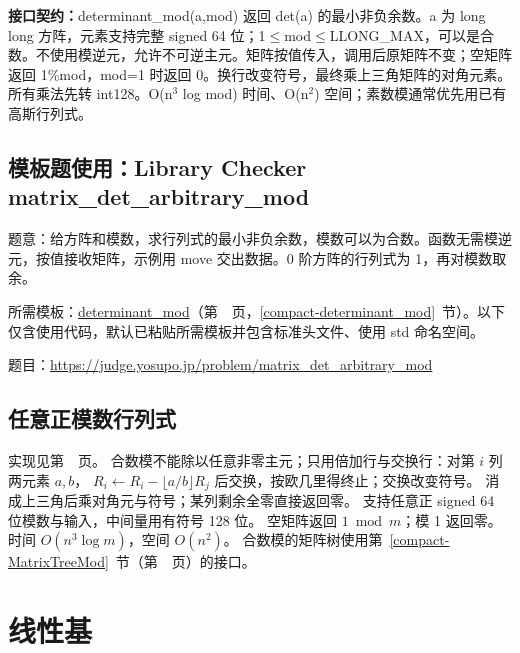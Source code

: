 {\sloppy{}\noindent\textbf{接口契约：}determinant\_mod(a,mod) 返回 det(a) 的最小非负余数。a 为 long long 方阵，元素支持完整 signed 64 位；1$\le$mod$\le$LLONG\_MAX，可以是合数。不使用模逆元，允许不可逆主元。矩阵按值传入，调用后原矩阵不变；空矩阵返回 1\%mod，mod=1 时返回 0。换行改变符号，最终乘上三角矩阵的对角元素。所有乘法先转 int128。O(n$^{3}$ log mod) 时间、O(n$^{2}$) 空间；素数模通常优先用已有高斯行列式。\par}



\Needspace{297pt}

\subsection*{模板题使用：Library Checker matrix\_det\_arbitrary\_mod}

\label{usage-example-77}

题意：给方阵和模数，求行列式的最小非负余数，模数可以为合数。函数无需模逆元，按值接收矩阵，示例用 move 交出数据。0 阶方阵的行列式为 1，再对模数取余。

所需模板：\hyperref[compact-determinant_mod]{determinant\_\allowbreak{}mod}（第~\pageref{compact-determinant_mod}~页，\ref{compact-determinant_mod}~节）。以下仅含使用代码，默认已粘贴所需模板并包含标准头文件、使用 std 命名空间。

题目：\url{https://judge.yosupo.jp/problem/matrix_det_arbitrary_mod}



\subsection{任意正模数行列式}\label{knowledge-det-mod}
实现见第~\pageref{compact-determinant_mod}~页。
合数模不能除以任意非零主元；只用倍加行与交换行：对第 $i$ 列两元素 $a,b$，
$R_i\leftarrow R_i-\lfloor a/b\rfloor R_j$ 后交换，按欧几里得终止；交换改变符号。
消成上三角后乘对角元与符号；某列剩余全零直接返回零。
支持任意正 signed 64 位模数与输入，中间量用有符号 128 位。
空矩阵返回 $1\bmod m$；模 1 返回零。时间 $O(n^3\log m)$，空间 $O(n^2)$。
合数模的矩阵树使用第~\ref{compact-MatrixTreeMod}~节（第~\pageref{compact-MatrixTreeMod}~页）的接口。

\clearpage


\newpage

\section{线性基}

